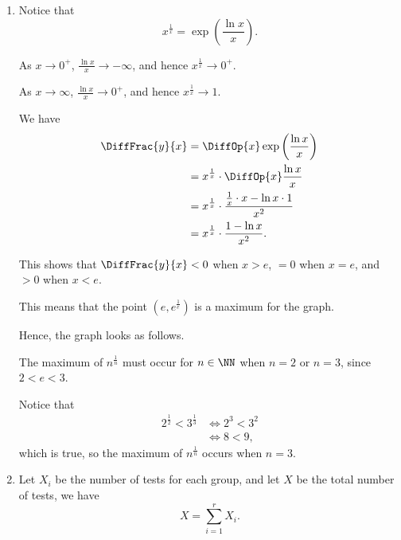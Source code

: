 \Question{\currfilebase}
\begin{enumerate}
    \item Notice that
          \[
              x^{\frac{1}{x}} = \exp \left(\frac{\ln x}{x}\right).
          \]

          As \(x \to 0^{+}\), \(\frac{\ln x}{x} \to -\infty\), and hence \(x^{\frac{1}{x}} \to 0^{+}\).

          As \(x \to \infty\), \(\frac{\ln x}{x} \to 0^{+}\), and hence \(x^{\frac{1}{x}} \to 1\).

          We have
          \begin{align*}
              \DiffFrac{y}{x} & = \DiffOp{x} \exp \left(\frac{\ln x}{x}\right)                          \\
                              & = x^{\frac{1}{x}} \cdot \DiffOp{x} \frac{\ln x}{x}                      \\
                              & = x^{\frac{1}{x}} \cdot \frac{\frac{1}{x} \cdot x - \ln x \cdot 1}{x^2} \\
                              & = x^{\frac{1}{x}} \cdot \frac{1 - \ln x}{x^2}.
          \end{align*}

          This shows that \(\DiffFrac{y}{x} < 0\) when \(x > e\), \(= 0\) when \(x = e\), and \(> 0\) when \(x < e\).

          This means that the point \(\left(e, e^{\frac{1}{e}}\right)\) is a maximum for the graph.

          Hence, the graph looks as follows.

          \begin{center}
              
          \end{center}

          The maximum of \(n^{\frac{1}{n}}\) must occur for \(n \in \NN\) when \(n = 2\) or \(n = 3\), since \(2 < e < 3\).

          Notice that
          \begin{align*}
              2^{\frac{1}{2}} < 3^{\frac{1}{3}} & \iff 2^{3} < 3^{2} \\
                                                & \iff 8 < 9,
          \end{align*}
          which is true, so the maximum of \(n^{\frac{1}{n}}\) occurs when \(n = 3\).

    \item Let \(X_i\) be the number of tests for each group, and let \(X\) be the total number of tests, we have
          \[
              X = \sum_{i = 1}^{r} X_i.
          \]


\end{enumerate}
